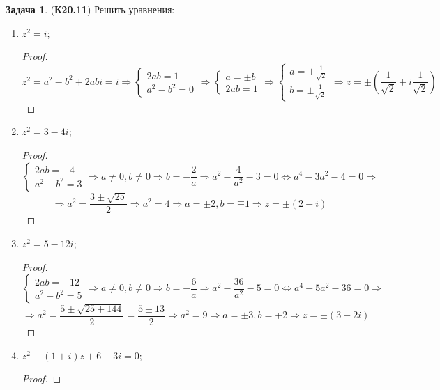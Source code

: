 \documentclass[12pt]{article}
\theoremstyle{definition}
\newtheorem{problem}{Задача}
\begin{document}
\begin{problem}(\textbf{К20.11})
	Решить уравнения:
	\begin{enumerate}[label=\asbuk*)]
		\item $z^2 = i$;
		\begin{proof}
			$$
				z^2 = a^2 -b^2 + 2abi = i \Rightarrow 
				\begin{cases}
					2ab = 1\\
					a^2 - b^2 = 0
				\end{cases} \Rightarrow
				\begin{cases}
					a = \pm b \\
					2ab = 1
				\end{cases} \Rightarrow
				\begin{cases}
					a = \pm \tfrac{1}{\sqrt{2}}\\
					b = \pm \tfrac{1}{\sqrt{2}}
				\end{cases} \Rightarrow
				z = \pm\left(\dfrac{1}{\sqrt{2}} + i \dfrac{1}{\sqrt{2}}\right)
			$$
		\end{proof}
		\item $z^2 = 3 - 4i$;
			\begin{proof}
				$$
					\begin{cases}
						2ab = -4\\
						a^2 - b^2 = 3
					\end{cases} \Rightarrow
					a \neq 0, b\neq 0 \Rightarrow b = -\dfrac{2}{a} \Rightarrow a^2 -\dfrac{4}{a^2} - 3 = 0 \Leftrightarrow a^4 -3a^2 - 4=0 \Rightarrow 
				$$
				$$
					\Rightarrow a^2 = \dfrac{3 \pm \sqrt{25}}{2} \Rightarrow a^2 = 4 \Rightarrow a = \pm2, b = \mp 1 \Rightarrow z = \pm(2 - i)
				$$
			\end{proof}
		\item $z^2 = 5 - 12i$;
			\begin{proof}
				$$
					\begin{cases}
						2ab = -12\\
						a^2 - b^2 = 5
					\end{cases} \Rightarrow
					a \neq 0, b\neq 0 \Rightarrow b = -\dfrac{6}{a} \Rightarrow a^2 -\dfrac{36}{a^2} - 5 = 0 \Leftrightarrow a^4 -5a^2 - 36=0 \Rightarrow 
				$$
				$$
					\Rightarrow a^2 = \dfrac{5 \pm \sqrt{25 + 144}}{2} = \dfrac{5 \pm 13}{2} \Rightarrow a^2 = 9 \Rightarrow a = \pm 3, b = \mp 2 \Rightarrow z = \pm(3 - 2i)
				$$
			\end{proof}
		\item $z^2 -(1 + i)z + 6 + 3i = 0$;
		\begin{proof}

\end{proof}
\end{enumerate}
\end{problem}
\end{document}

